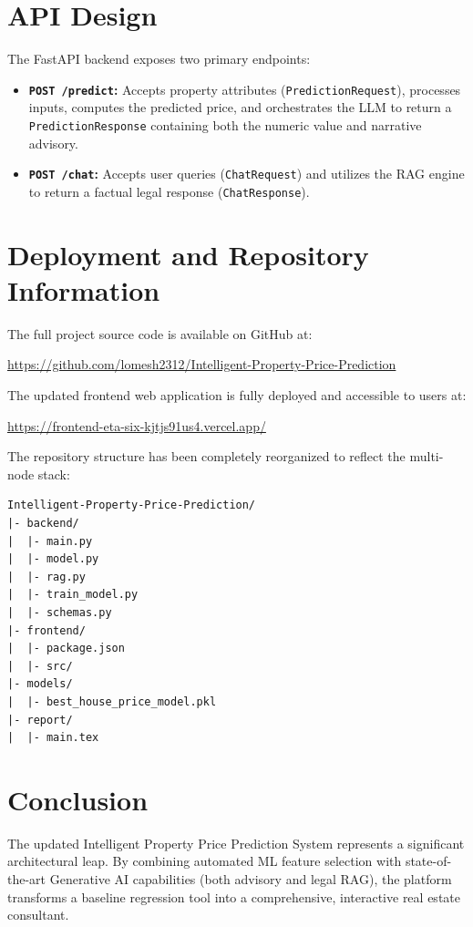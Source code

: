 \documentclass[conference]{IEEEtran}
\begin{document}
\section{API Design}
The FastAPI backend exposes two primary endpoints:
\begin{itemize}
    \item \textbf{\texttt{POST /predict}:} Accepts property attributes (\texttt{PredictionRequest}), processes inputs, computes the predicted price, and orchestrates the LLM to return a \texttt{PredictionResponse} containing both the numeric value and narrative advisory.
    \item \textbf{\texttt{POST /chat}:} Accepts user queries (\texttt{ChatRequest}) and utilizes the RAG engine to return a factual legal response (\texttt{ChatResponse}).
\end{itemize}

\section{Deployment and Repository Information}
The full project source code is available on GitHub at:
\begin{center}
\url{https://github.com/lomesh2312/Intelligent-Property-Price-Prediction}
\end{center}

The updated frontend web application is fully deployed and accessible to users at:
\begin{center}
\url{https://frontend-eta-six-kjtjs91us4.vercel.app/}
\end{center}

The repository structure has been completely reorganized to reflect the multi-node stack:
\begin{lstlisting}[language={}]
Intelligent-Property-Price-Prediction/
|- backend/
|  |- main.py
|  |- model.py
|  |- rag.py
|  |- train_model.py
|  |- schemas.py
|- frontend/
|  |- package.json
|  |- src/
|- models/
|  |- best_house_price_model.pkl
|- report/
|  |- main.tex
\end{lstlisting}

\section{Conclusion}
The updated Intelligent Property Price Prediction System represents a significant architectural leap. By combining automated ML feature selection with state-of-the-art Generative AI capabilities (both advisory and legal RAG), the platform transforms a baseline regression tool into a comprehensive, interactive real estate consultant.
\end{document}
